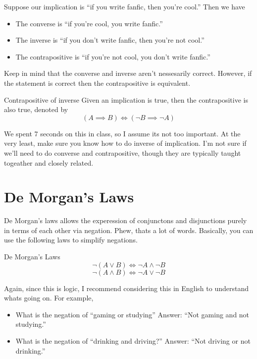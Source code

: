 \begin{boxexample}{}{}
	Suppose our implication is ``if you write fanfic, then you're cool.'' Then we have
	
	\begin{itemize}
		\item The converse is ``if you're cool, you write fanfic.''
		\item The inverse is ``if you don't write fanfic, then you're not cool.''
		\item The contrapositive is ``if you're not cool, you don't write fanfic.''
	\end{itemize}
\end{boxexample}

Keep in mind that the converse and inverse aren't nessesarily correct. However, if the statement is correct then the contrapositive is equivalent.

\begin{boxproposition}{Contrapositive of inverse}{}
	Given an implication is true, then the contrapositive is also true, denoted by
	\[
		(A \implies B) \iff (\lnot B \implies \lnot A)
	\]
\end{boxproposition}

We spent 7 seconds on this in class, so I assume its not too important. At the very least, make sure you know how to do inverse of implication. I'm not sure if we'll need to do converse and contrapositive, though they are typically taught togeather and closely related.

\section{De Morgan's Laws}

De Morgan's laws allows the experession of conjunctons and disjunctions purely in terms of each other via negation. Phew, thats a lot of words. Basically, you can use the following laws to simplify negations.

\begin{boxproposition}{De Morgan's Laws}{}
	\[
		\lnot (A \lor B) \iff \lnot A \land \lnot B
	\]
	\[
		\lnot (A \land B) \iff \lnot A \lor \lnot B
	\]
\end{boxproposition}

Again, since this is logic, I recommend considering this in English to understand whats going on. For example,

\begin{boxexample}{}{}
	\begin{itemize}
		\item What is the negation of ``gaming or studying'' Answer: ``Not gaming and not studying.''
		\item What is the negation of ``drinking and driving?'' Answer: ``Not driving or not drinking.''
	\end{itemize}
\end{boxexample}

